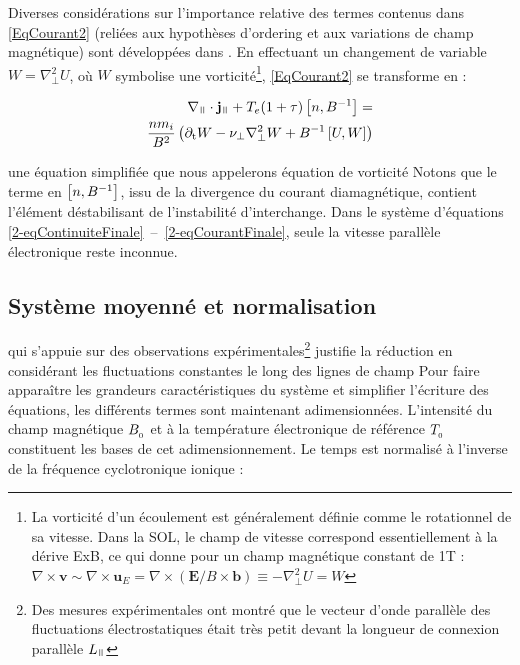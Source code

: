 \begin{refsection}
Diverses considérations sur l'importance relative des termes contenus dans
\eqref{EqCourant2} (reliées aux hypothèses d'ordering
et aux variations de champ magnétique) sont développées dans
\cite{SarazinPhD}. En effectuant un changement de variable $W=\nabla_\perp^2U$, où $W$ symbolise
une vorticité\footnote{La vorticité d'un écoulement est généralement définie comme le rotationnel de sa vitesse. Dans la SOL, le champ de vitesse correspond essentiellement à la dérive ExB, ce qui donne pour un
champ magnétique constant de 1T : 
$\nabla\times\mathbf{v}\sim\nabla\times\mathbf{u}_E=\nabla\times(\mathbf{E}/B\times\mathbf{b})\equiv-\nabla_\perp^2
U=W$ }, \eqref{EqCourant2} se transforme en :

\begin{equation}\begin{split}
\label{2-eqCourantFinale}
\nabla_\para\cdot\mathbf{j}_\para +
T_e(1+\tau)\left[n,B\puissance{-1}\right] =\\
\frac{nm_i}{B^2}\left(\partial_\text{t}W - \nu_\perp
\nabla_\perp^2W+
B\puissance{-1}\left[U,W\right]\right)
\end{split}
\end{equation}

une équation simplifiée que nous
appelerons équation de vorticité 
Notons que le terme en $\left[n,B^{{-1}}\right]$, issu de la divergence
du courant diamagnétique, contient l'élément déstabilisant de
 l'instabilité d'interchange. Dans le système d'équations
 \eqref{2-eqContinuiteFinale}~--~\eqref{2-eqCourantFinale}, seule la vitesse
 parallèle électronique reste inconnue. 

\subsection{Système moyenné et normalisation}
\label{2-flute}
qui s'appuie sur des observations
expérimentales\footnote{Des mesures expérimentales ont montré que le
vecteur d'onde parallèle des fluctuations électrostatiques était très
petit devant la longueur de connexion parallèle $L_\para$} justifie la réduction en considérant les
fluctuations constantes le long des lignes de champ
Pour faire apparaître les grandeurs caractéristiques du système et simplifier
l'écriture des équations, les différents termes sont
maintenant adimensionnées. L'intensité du champ
magnétique $B_{_{0}}$ et à la température électronique de référence
$T_{_{0}}$ constituent les bases de cet adimensionnement. Le temps est
normalisé à l'inverse de la fréquence cyclotronique ionique :


\end{refsection}
